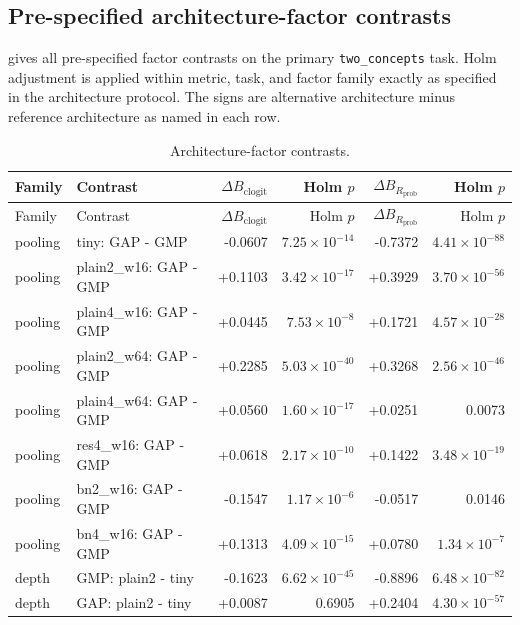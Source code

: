 \subsection{Pre-specified architecture-factor contrasts}\label{app:architecture-factors}

 gives all pre-specified factor contrasts on the primary \texttt{two\_concepts} task. Holm adjustment is applied within metric, task, and factor family exactly as specified in the architecture protocol. The signs are alternative architecture minus reference architecture as named in each row.

{\scriptsize
\setlength{\tabcolsep}{3pt}
\begin{longtable}{p{.10\linewidth}p{.38\linewidth}rrrr}
\caption{Architecture-factor contrasts.}\label{tab:app-architecture-factors}\\
\toprule
Family & Contrast & $\Delta B_{\mathrm{clogit}}$ & Holm $p$ & $\Delta B_{R_{\mathrm{prob}}}$ & Holm $p$ \\
\midrule
\endfirsthead
\toprule
Family & Contrast & $\Delta B_{\mathrm{clogit}}$ & Holm $p$ & $\Delta B_{R_{\mathrm{prob}}}$ & Holm $p$ \\
\midrule
\endhead
\bottomrule
\endfoot
pooling & tiny: GAP - GMP & -0.0607 & $7.25\times10^{-14}$ & -0.7372 & $4.41\times10^{-88}$ \\
pooling & plain2\_w16: GAP - GMP & +0.1103 & $3.42\times10^{-17}$ & +0.3929 & $3.70\times10^{-56}$ \\
pooling & plain4\_w16: GAP - GMP & +0.0445 & $7.53\times10^{-8}$ & +0.1721 & $4.57\times10^{-28}$ \\
pooling & plain2\_w64: GAP - GMP & +0.2285 & $5.03\times10^{-40}$ & +0.3268 & $2.56\times10^{-46}$ \\
pooling & plain4\_w64: GAP - GMP & +0.0560 & $1.60\times10^{-17}$ & +0.0251 & 0.0073 \\
pooling & res4\_w16: GAP - GMP & +0.0618 & $2.17\times10^{-10}$ & +0.1422 & $3.48\times10^{-19}$ \\
pooling & bn2\_w16: GAP - GMP & -0.1547 & $1.17\times10^{-6}$ & -0.0517 & 0.0146 \\
pooling & bn4\_w16: GAP - GMP & +0.1313 & $4.09\times10^{-15}$ & +0.0780 & $1.34\times10^{-7}$ \\
depth & GMP: plain2 - tiny & -0.1623 & $6.62\times10^{-45}$ & -0.8896 & $6.48\times10^{-82}$ \\
depth & GAP: plain2 - tiny & +0.0087 & 0.6905 & +0.2404 & $4.30\times10^{-57}$ \\

\end{longtable}}
